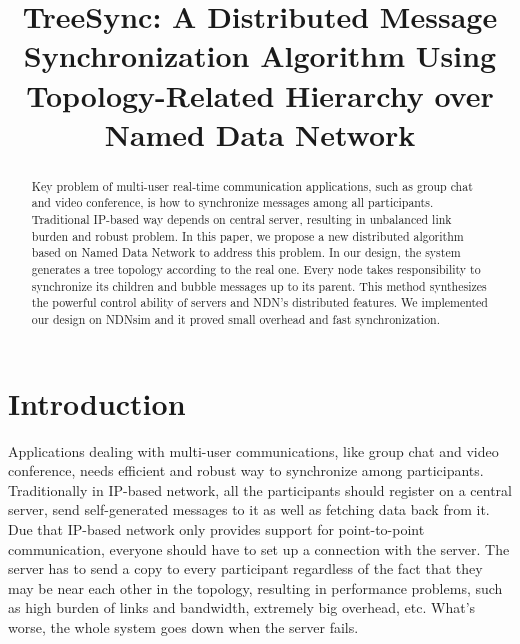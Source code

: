 \documentclass[conference]{IEEEtran}
\begin{document}
\title{TreeSync: A Distributed Message Synchronization Algorithm Using Topology-Related Hierarchy over Named Data Network}
\maketitle


\begin{abstract}
Key problem of multi-user real-time communication applications,
such as group chat and video conference,
is how to synchronize messages among all participants.
Traditional IP-based way depends on central server, resulting in unbalanced link burden and robust problem.
In this paper, we propose a new distributed algorithm based on Named Data Network to address this problem.
In our design, the system generates a tree topology according to the real one.
Every node takes responsibility to synchronize its children and bubble messages up to its parent.
This method synthesizes the powerful control ability of servers and NDN's distributed features.
We implemented our design on NDNsim and it proved small overhead and fast synchronization.
\end{abstract}

\IEEEpeerreviewmaketitle

\section{Introduction}

Applications dealing with multi-user communications,
like group chat and video conference,
needs efficient and robust way to synchronize among participants.
Traditionally in IP-based network,
all the participants should register on a central server,
send self-generated messages to it as well as fetching data back from it.
Due that IP-based network only provides support for point-to-point communication,
everyone should have to set up a connection with the server.
The server has to send a copy to every participant regardless of the fact that
they may be near each other in the topology,
resulting in performance problems, such as high burden of links and bandwidth,
extremely big overhead, etc.
What's worse, the whole system goes down when the server fails.
\end{document}
